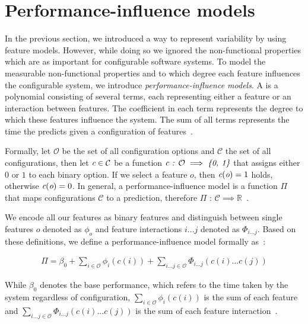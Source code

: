 \section{Performance-influence models}\label{ch:performance-influence-models}
In the previous section, we introduced a way to represent variability by using feature models.
However, while doing so we ignored the non-functional properties which are as important for configurable software systems.
To model the measurable non-functional properties and to which degree each feature influences the configurable system,
we introduce \emph{performance-influence models}. 
A {\perfInfluenceModel} is a polynomial consisting of several terms, each representing either a feature or an interaction between features.
The coefficient in each term represents the degree to which these features influence the system.  
The sum of all terms represents the time the {\perfInfluenceModel} predicts given a configuration of features~\cite{Performance-influence-models-for-highly-configurable-systems}.

Formally, let $\mathcal{O}$ be the set of all configuration options and $\mathcal{C}$ the set of all configurations, 
then let $\emph{c} \in \mathcal{C}$ be a function $\emph{c} \textit{ : } \mathcal{O} \implies \emph{\{0, 1\}}$ that assigns either $0$ or $1$ to each binary option. 
If we select a feature $o$, then $\emph{c}(\emph{o}) = 1$ holds, otherwise $\emph{c}(\emph{o}) = 0$. 
In general, a performance-influence model is a function $\Pi$ that maps configurations $\mathcal{C}$ to a prediction, 
therefore $\Pi \textit{ : } \mathcal{C} \implies \mathbb{R}$~\cite{Performance-influence-models-for-highly-configurable-systems}. 

We encode all our features as binary features and distinguish between single features $o$ denoted as $\phi_o$ and feature interactions $i ... j$ denoted as $\Phi_{i...j}$. 
Based on these definitions, we define a performance-influence model formally as~\cite{Performance-influence-models-for-highly-configurable-systems}:

\begin{gather}
    \Pi = \beta_0 + \sum_{i \in \mathcal{O}} \phi_i(c(i)) + \sum_{i...j \in \mathcal{O}} \Phi_{i...j}(c(i)...c(j))
\end{gather}

While $\beta_0$ denotes the base performance, which refers to the time taken by the system regardless of configuration, $\sum_{i \in \mathcal{O}} \phi_i(c(i))$ 
is the sum of each feature and $\sum_{i...j \in \mathcal{O}} \Phi_{i...j}(c(i)...c(j))$ is the sum of each feature interaction~\cite{Performance-influence-models-for-highly-configurable-systems}.

